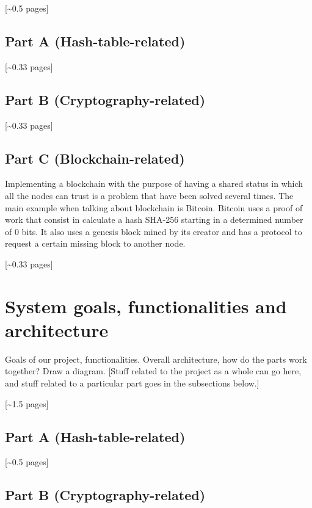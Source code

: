 \documentclass[12pt,a4paper,draft]{article}
\begin{document}
[\textasciitilde{}0.5 pages]

\subsection{Part A (Hash-table-related)}

[\textasciitilde{}0.33 pages]

\subsection{Part B (Cryptography-related)}

[\textasciitilde{}0.33 pages]

\subsection{Part C (Blockchain-related)}

Implementing a blockchain with the purpose of having a shared status in which all the nodes can trust is a problem that have been solved several times. The main example when talking about blockchain is Bitcoin. Bitcoin uses a proof of work that consist in calculate a hash SHA-256 starting in a determined number of 0 bits. It also uses a genesis block mined by its creator and has a protocol to request a certain missing block to another node.

[\textasciitilde{}0.33 pages]

\section{System goals, functionalities and architecture}

Goals of our project, functionalities.
Overall architecture, how do the parts work together?
Draw a diagram.
[Stuff related to the project as a whole can go here, and stuff related to a particular part goes in the subsections below.]

[\textasciitilde{}1.5 pages]

\subsection{Part A (Hash-table-related)}

[\textasciitilde{}0.5 pages]

\subsection{Part B (Cryptography-related)}
\end{document}
